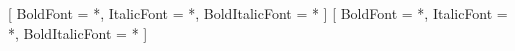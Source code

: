 

\newCJKfontfamily\kai{\kaifontname}[
  BoldFont = *,
  ItalicFont = *,
  BoldItalicFont = *
]
\newCJKfontfamily\fang{\fangfontname}[
  BoldFont = *,
  ItalicFont = *,
  BoldItalicFont = *
]

\usepackage[fontset=fandol]{ctex}


